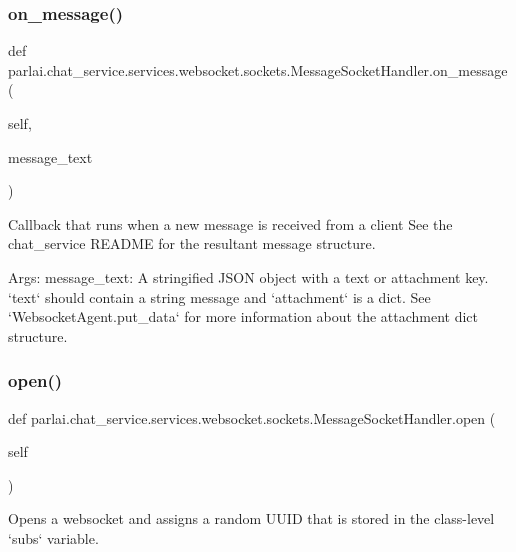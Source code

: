 \subsubsection{\texorpdfstring{on\+\_\+message()}{on\_message()}}
{\footnotesize\ttfamily def parlai.\+chat\+\_\+service.\+services.\+websocket.\+sockets.\+Message\+Socket\+Handler.\+on\+\_\+message (\begin{DoxyParamCaption}\item[{}]{self,  }\item[{}]{message\+\_\+text }\end{DoxyParamCaption})}

\begin{DoxyVerb}Callback that runs when a new message is received from a client See the
chat_service README for the resultant message structure.

Args:
    message_text: A stringified JSON object with a text or attachment key.
`text` should contain a string message and `attachment` is a dict.
See `WebsocketAgent.put_data` for more information about the
attachment dict structure.
\end{DoxyVerb}
 \mbox{\label{classparlai_1_1chat__service_1_1services_1_1websocket_1_1sockets_1_1MessageSocketHandler_a3b5c9e9fc500c312e1895c6220d52ca7}} 
\subsubsection{\texorpdfstring{open()}{open()}}
{\footnotesize\ttfamily def parlai.\+chat\+\_\+service.\+services.\+websocket.\+sockets.\+Message\+Socket\+Handler.\+open (\begin{DoxyParamCaption}\item[{}]{self }\end{DoxyParamCaption})}

\begin{DoxyVerb}Opens a websocket and assigns a random UUID that is stored in the class-level
`subs` variable.
\end{DoxyVerb}
 

